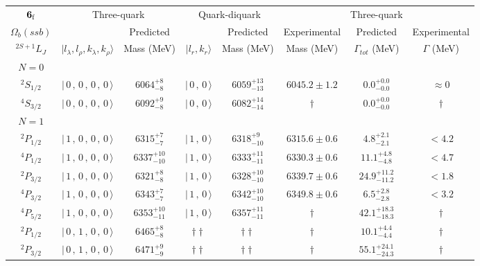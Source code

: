 \begin{tabular}{c| c c c c c c c}\hline \hline
${\bf {6}}_{\rm f}$ & \multicolumn{2}{c}{Three-quark} &  \multicolumn{2}{c}{Quark-diquark}   &    &  Three-quark  &\\ 
$\Omega_{b}(ssb)$ &   & Predicted  &   &  Predicted   &  Experimental &  Predicted            & Experimental \\ 
 $^{2S+1}L_{J}$ & $\vert l_{\lambda}, l_{\rho}, k_{\lambda}, k_{\rho} \rangle$ & Mass (MeV)  & $\vert l_{r}, k_{r} \rangle$  &  Mass (MeV)   &  Mass (MeV)   &  $\Gamma_{tot}$ (MeV) & $\Gamma$ (MeV) \\ \hline
\hline
 $N=0$  &  &  &  &  &  \\ 
$^{2}S_{1/2}$ & $\vert \,0\,,\,0\,,\,0\,,\,0 \,\rangle $ & $6064^{+8}_{-8}$ & $\vert \,0\,,\,0 \,\rangle$ & $6059^{+13}_{-13}$ & $6045.2\pm 1.2$ & $0.0^{+0.0}_{-0.0}$ & $\approx 0$ \\ 
$^{4}S_{3/2}$ & $\vert \,0\,,\,0\,,\,0\,,\,0 \,\rangle $ & $6092^{+9}_{-8}$ & $\vert \,0\,,\,0 \,\rangle$ & $6082^{+14}_{-14}$ & $\dagger$ & $0.0^{+0.0}_{-0.0}$ & $\dagger$ \\ 
\hline
 $N=1$  &  &  &  &  &  \\ 
$^{2}P_{1/2}$ & $\vert \,1\,,\,0\,,\,0\,,\,0 \,\rangle $ & $6315^{+7}_{-7}$ & $\vert \,1\,,\,0 \,\rangle$ & $6318^{+9}_{-10}$ & $6315.6\pm 0.6$ & $4.8^{+2.1}_{-2.1}$ & $<4.2$ \\ 
$^{4}P_{1/2}$ & $\vert \,1\,,\,0\,,\,0\,,\,0 \,\rangle $ & $6337^{+10}_{-10}$ & $\vert \,1\,,\,0 \,\rangle$ & $6333^{+11}_{-11}$ & $6330.3\pm 0.6$ & $11.1^{+4.8}_{-4.8}$ & $<4.7$ \\ 
$^{2}P_{3/2}$ & $\vert \,1\,,\,0\,,\,0\,,\,0 \,\rangle $ & $6321^{+8}_{-8}$ & $\vert \,1\,,\,0 \,\rangle$ & $6328^{+10}_{-10}$ & $6339.7\pm 0.6$ & $24.9^{+11.2}_{-11.2}$ & $<1.8$ \\ 
$^{4}P_{3/2}$ & $\vert \,1\,,\,0\,,\,0\,,\,0 \,\rangle $ & $6343^{+7}_{-7}$ & $\vert \,1\,,\,0 \,\rangle$ & $6342^{+10}_{-10}$ & $6349.8\pm 0.6$ & $6.5^{+2.8}_{-2.8}$ & $<3.2$ \\ 
$^{4}P_{5/2}$ & $\vert \,1\,,\,0\,,\,0\,,\,0 \,\rangle $ & $6353^{+10}_{-11}$ & $\vert \,1\,,\,0 \,\rangle$ & $6357^{+11}_{-11}$ & $\dagger$ & $42.1^{+18.3}_{-18.3}$ & $\dagger$ \\ 
$^{2}P_{1/2}$ & $\vert \,0\,,\,1\,,\,0\,,\,0 \,\rangle $ & $6465^{+8}_{-8}$ & $\dagger\dagger$ & $\dagger\dagger$ & $\dagger$ & $10.1^{+4.4}_{-4.4}$ & $\dagger$ \\ 
$^{2}P_{3/2}$ & $\vert \,0\,,\,1\,,\,0\,,\,0 \,\rangle $ & $6471^{+9}_{-9}$ & $\dagger\dagger$ & $\dagger\dagger$ & $\dagger$ & $55.1^{+24.1}_{-24.3}$ & $\dagger$ \\ 

\end{tabular}
